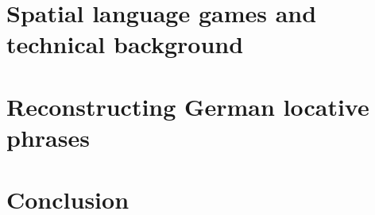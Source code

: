 \documentclass[
	        ,output=long    %
	        ,draftmode 
		  ]{LSP/langsci}
\begin{document}
\maketitle  

\frontmatter




\tableofcontents

\mainmatter	



\part{Spatial language games and technical background}
\label{p:embodied-language-games}




 \part{Reconstructing German locative phrases} 
 \label{p:german-locative-phrases}
 
 
 
% 
% 
% 
% 
% 
% 
% 	

 \part{Conclusion}
% 

\backmatter



\printindex
  
\printindex[lan] 
  
\printindex[sbj]

\end{document}
